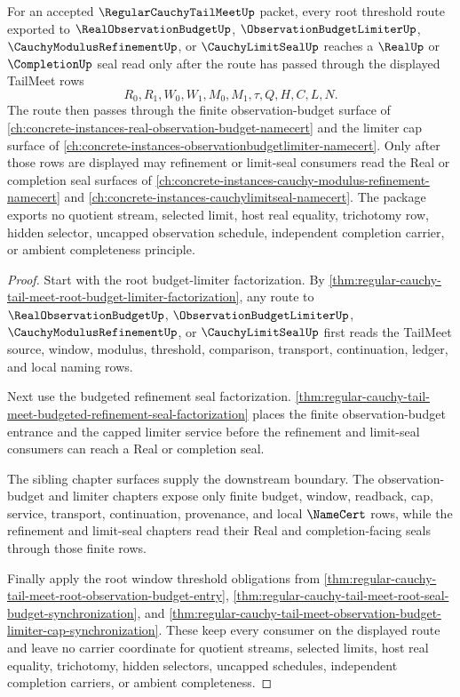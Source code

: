 \begin{theorem}
\label{thm:regular-cauchy-tail-meet-root-downstream-budget-seal-package}
For an accepted $\RegularCauchyTailMeetUp$ packet, every root threshold route exported to $\RealObservationBudgetUp$, $\ObservationBudgetLimiterUp$, $\CauchyModulusRefinementUp$, or $\CauchyLimitSealUp$ reaches a $\RealUp$ or $\CompletionUp$ seal read only after the route has passed through the displayed TailMeet rows
$$
R_0,R_1,W_0,W_1,M_0,M_1,\tau,Q,H,C,L,N.
$$
The route then passes through the finite observation-budget surface of \autoref{ch:concrete-instances-real-observation-budget-namecert} and the limiter cap surface of \autoref{ch:concrete-instances-observationbudgetlimiter-namecert}. Only after those rows are displayed may refinement or limit-seal consumers read the Real or completion seal surfaces of \autoref{ch:concrete-instances-cauchy-modulus-refinement-namecert} and \autoref{ch:concrete-instances-cauchylimitseal-namecert}. The package exports no quotient stream, selected limit, host real equality, trichotomy row, hidden selector, uncapped observation schedule, independent completion carrier, or ambient completeness principle.
\end{theorem}
\begin{proof}
Start with the root budget-limiter factorization. By \autoref{thm:regular-cauchy-tail-meet-root-budget-limiter-factorization}, any route to $\RealObservationBudgetUp$, $\ObservationBudgetLimiterUp$, $\CauchyModulusRefinementUp$, or $\CauchyLimitSealUp$ first reads the TailMeet source, window, modulus, threshold, comparison, transport, continuation, ledger, and local naming rows.

Next use the budgeted refinement seal factorization. \autoref{thm:regular-cauchy-tail-meet-budgeted-refinement-seal-factorization} places the finite observation-budget entrance and the capped limiter service before the refinement and limit-seal consumers can reach a Real or completion seal.

The sibling chapter surfaces supply the downstream boundary. The observation-budget and limiter chapters expose only finite budget, window, readback, cap, service, transport, continuation, provenance, and local $\NameCert$ rows, while the refinement and limit-seal chapters read their Real and completion-facing seals through those finite rows.

Finally apply the root window threshold obligations from \autoref{thm:regular-cauchy-tail-meet-root-observation-budget-entry}, \autoref{thm:regular-cauchy-tail-meet-root-seal-budget-synchronization}, and \autoref{thm:regular-cauchy-tail-meet-observation-budget-limiter-cap-synchronization}. These keep every consumer on the displayed route and leave no carrier coordinate for quotient streams, selected limits, host real equality, trichotomy, hidden selectors, uncapped schedules, independent completion carriers, or ambient completeness.
\end{proof}


